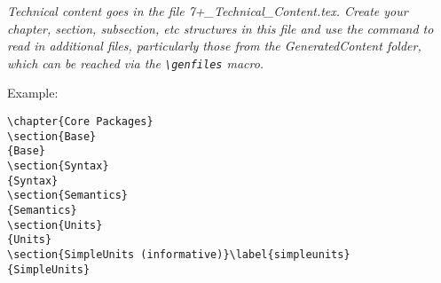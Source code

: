 { \itshape \color{red} Technical content goes in the file 7+\_Technical\_Content.tex.  Create your chapter, section, subsection, etc structures in this file and use the \lstinline!! command to read in additional files, particularly those from the GeneratedContent folder, which can be reached via the \lstinline!\genfiles! macro.  

Example:
\begin{lstlisting}
\chapter{Core Packages}
\section{Base}
{Base}
\section{Syntax}
{Syntax}
\section{Semantics}
{Semantics}
\section{Units}
{Units}
\section{SimpleUnits (informative)}\label{simpleunits}
{SimpleUnits}
\end{lstlisting}

}
